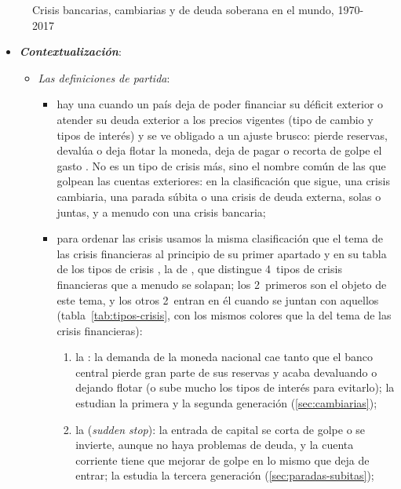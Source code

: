 \documentclass[11pt]{article}
\begin{document}
\begin{figure}[H]
\centering
\caption{Crisis bancarias, cambiarias y de deuda soberana en el mundo, 1970-2017}\label{fig:crisis-frecuencia}
\end{figure}

\begin{itemize}
\item \textbf{\emph{Contextualización}}:
  \begin{itemize}
  \item \emph{Las definiciones de partida}:
    \begin{itemize}
    \item hay una  cuando un país deja de poder financiar su déficit exterior o atender su deuda exterior a los precios vigentes (tipo de cambio y tipos de interés) y se ve obligado a un ajuste brusco: pierde reservas, devalúa o deja flotar la moneda, deja de pagar o recorta de golpe el gasto  . No es un tipo de crisis más, sino el nombre común de las que golpean las cuentas exteriores: en la clasificación que sigue, una crisis cambiaria, una parada súbita o una crisis de deuda externa, solas o juntas, y a menudo con una crisis bancaria;
    \item para ordenar las crisis usamos la misma clasificación que el tema de las crisis financieras al principio de su primer apartado y en su tabla de los tipos de crisis , la de \textcite{ClaessensKose2013Financial}, que distingue 4~tipos de crisis financieras que a menudo se solapan; los 2~primeros son el objeto de este tema, y los otros 2~entran en él cuando se juntan con aquellos (tabla~\ref{tab:tipos-crisis}, con los mismos colores que la del tema de las crisis financieras):
      \begin{enumerate}
      \item la : la demanda de la moneda nacional cae tanto que el banco central pierde gran parte de sus reservas y acaba devaluando o dejando flotar (o sube mucho los tipos de interés para evitarlo); la estudian la primera y la segunda generación (\ref{sec:cambiarias});
      \item la  (\emph{sudden stop}): la entrada de capital se corta de golpe o se invierte, aunque no haya problemas de deuda, y la cuenta corriente tiene que mejorar de golpe en lo mismo que deja de entrar\nocite{Calvo1998SuddenStops}; la estudia la tercera generación (\ref{sec:paradas-subitas});

\end{enumerate}
\end{itemize}
\end{itemize}
\end{itemize}
\end{document}

